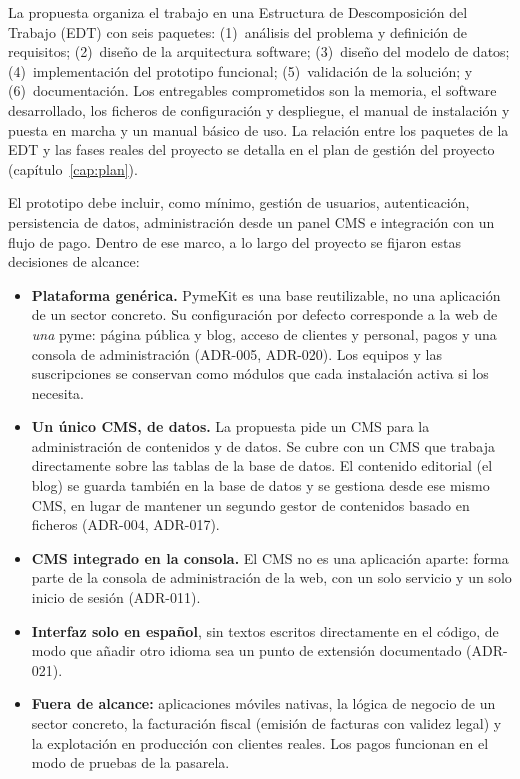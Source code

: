 La propuesta organiza el trabajo en una Estructura de Descomposición del
Trabajo (EDT) con seis paquetes: (1)~análisis del problema y definición de
requisitos; (2)~diseño de la arquitectura software; (3)~diseño del modelo de
datos; (4)~implementación del prototipo funcional; (5)~validación de la
solución; y (6)~documentación. Los entregables comprometidos son la memoria,
el software desarrollado, los ficheros de configuración y despliegue, el
manual de instalación y puesta en marcha y un manual básico de uso. La
relación entre los paquetes de la EDT y las fases reales del proyecto se
detalla en el plan de gestión del proyecto (capítulo~\ref{cap:plan}).

El prototipo debe incluir, como mínimo, gestión de usuarios, autenticación,
persistencia de datos, administración desde un panel CMS e integración con un
flujo de pago. Dentro de ese marco, a lo largo del proyecto se fijaron estas
decisiones de alcance:

\begin{itemize}
  \item \textbf{Plataforma genérica.} PymeKit es una base reutilizable, no
        una aplicación de un sector concreto. Su configuración por defecto
        corresponde a la web de \emph{una} pyme: página pública y blog,
        acceso de clientes y personal, pagos y una consola de administración
        (ADR-005, ADR-020). Los equipos y las suscripciones se conservan
        como módulos que cada instalación activa si los necesita.
  \item \textbf{Un único CMS, de datos.} La propuesta pide un CMS para la
        administración de contenidos y de datos. Se cubre con un CMS que
        trabaja directamente sobre las tablas de la base de datos. El
        contenido editorial (el blog) se guarda también en la base de datos y
        se gestiona desde ese mismo CMS, en lugar de mantener un segundo gestor
        de contenidos basado en ficheros (ADR-004, ADR-017).
  \item \textbf{CMS integrado en la consola.} El CMS no es una aplicación
        aparte: forma parte de la consola de administración de la web, con un
        solo servicio y un solo inicio de sesión (ADR-011).
  \item \textbf{Interfaz solo en español}, sin textos escritos directamente
        en el código, de modo que añadir otro idioma sea un punto de
        extensión documentado (ADR-021).
  \item \textbf{Fuera de alcance:} aplicaciones móviles nativas, la lógica
        de negocio de un sector concreto, la facturación fiscal (emisión de
        facturas con validez legal) y la explotación en producción con
        clientes reales. Los pagos funcionan en el modo de pruebas de la
        pasarela.
\end{itemize}


